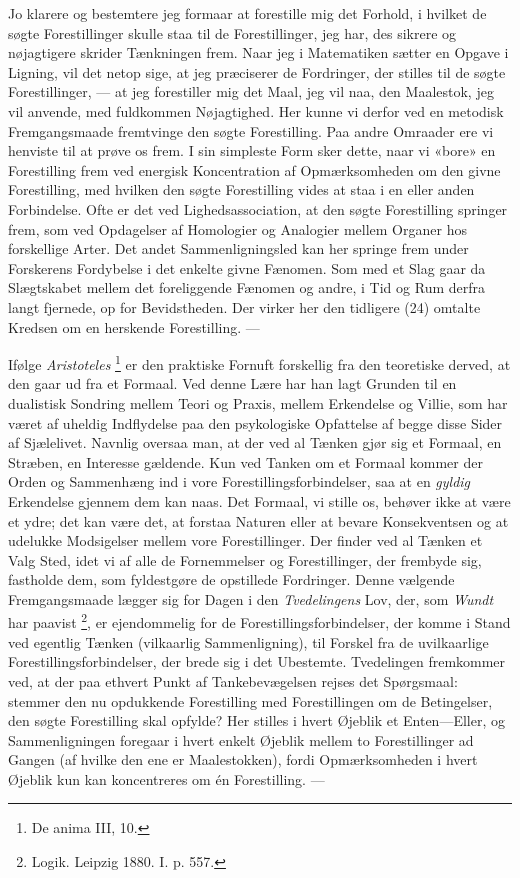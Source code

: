 \documentclass[12pt,a4paper,openany]{book}
\newcommand{\opage}[1]{\marginnote{\footnotesize\textit{[#1]}}}
\begin{document}
Jo klarere og bestemtere jeg formaar at forestille mig det Forhold, i hvilket
de søgte Forestillinger skulle staa til de Forestillinger, jeg har, des sikrere
og nøjagtigere skrider Tænkningen frem. Naar jeg i Matematiken sætter en Opgave
i Ligning, vil det netop sige, at jeg præciserer de Fordringer, der stilles til
de søgte Forestillinger, --- at jeg forestiller mig det Maal, jeg vil naa, den
Maalestok, jeg vil anvende, med fuldkommen Nøjagtighed. Her kunne vi derfor ved
en metodisk Fremgangsmaade fremtvinge den søgte Forestilling. Paa andre
Omraader ere vi henviste til at prøve os frem. I sin simpleste Form sker dette,
naar vi «bore» en Forestilling frem ved energisk Koncentration af
Opmærksomheden om den givne Forestilling, med hvilken den søgte Forestilling
vides at staa i en eller anden Forbindelse. Ofte er det ved Lighedsassociation,
at den søgte Forestilling springer frem, som ved Opdagelser af Homologier og
Analogier mellem Organer hos forskellige Arter. Det andet Sammenligningsled kan
her springe frem under Forskerens Fordybelse i det enkelte givne Fænomen. Som
med et Slag gaar da Slægtskabet mellem det foreliggende Fænomen og andre, i Tid
og Rum derfra langt fjernede, op for Bevidstheden. Der virker her den tidligere
(24) omtalte Kredsen om en herskende Forestilling. ---

Ifølge \emph{Aristoteles}%
\footnote[2]{De anima III, 10.} er den praktiske Fornuft forskellig fra den
teoretiske derved, at den gaar ud fra et Formaal. Ved denne Lære har han lagt
Grunden til en dualistisk Sondring mellem Teori og Praxis, mellem Erkendelse og
Villie, som har været af uheldig Indflydelse paa den psykologiske Opfattelse af
begge disse Sider af Sjælelivet. Navnlig oversaa man, at der ved al Tænken gjør
sig et Formaal, en Stræben, en Interesse gældende. Kun ved Tanken om et Formaal
kommer der Orden og Sammenhæng ind i vore Forestillingsforbindelser, saa at en
\emph{gyldig} Erkendelse gjennem dem kan naas. Det Formaal, vi stille os,
behøver ikke at være et ydre; det kan være det, at forstaa Naturen
\setcounter{footnote}{0}%
\opage{66}eller at bevare Konsekventsen og at udelukke Modsigelser mellem vore
Forestillinger. Der finder ved al Tænken et Valg Sted, idet vi af alle de
Fornemmelser og Forestillinger, der frembyde sig, fastholde dem, som
fyldestgøre de opstillede Fordringer. Denne vælgende Fremgangsmaade lægger sig
for Dagen i den \emph{Tvedelingens} Lov, der, som \emph{Wundt} har paavist%
\footnote[1]{Logik. Leipzig 1880. I. p. 557.}, er ejendommelig for de
Forestillingsforbindelser, der komme i Stand ved egentlig Tænken (vilkaarlig
Sammenligning), til Forskel fra de uvilkaarlige Forestillingsforbindelser, der
brede sig i det Ubestemte. Tvedelingen fremkommer ved, at der paa ethvert Punkt
af Tankebevægelsen rejses det Spørgsmaal: stemmer den nu opdukkende
Forestilling med Forestillingen om de Betingelser, den søgte Forestilling skal
opfylde? Her stilles i hvert Øjeblik et Enten---Eller, og Sammenligningen
foregaar i hvert enkelt Øjeblik mellem to Forestillinger ad Gangen (af hvilke
den ene er Maalestokken), fordi Opmærksomheden i hvert Øjeblik kun kan
koncentreres om én Forestilling. ---
\end{document}
